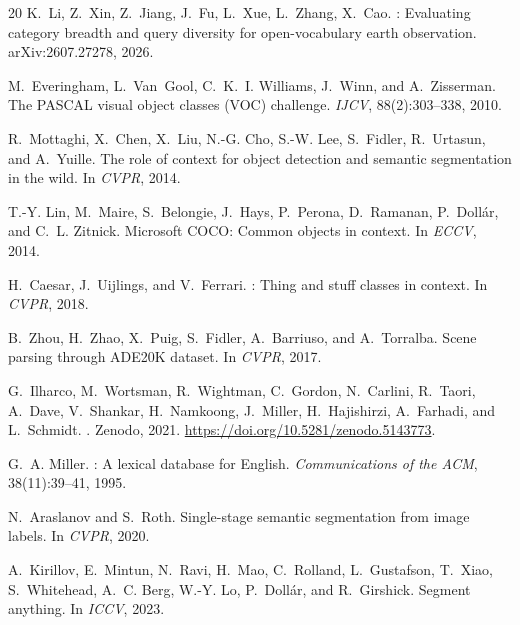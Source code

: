 \documentclass[11pt]{article}
\begin{document}
\begin{thebibliography}{20}
K.~Li, Z.~Xin, Z.~Jiang, J.~Fu, L.~Xue, L.~Zhang, X.~Cao.
: Evaluating category breadth and query diversity for
  open-vocabulary earth observation.
\newblock arXiv:2607.27278, 2026.

M.~Everingham, L.~Van~Gool, C.~K.~I. Williams, J.~Winn, and A.~Zisserman.
\newblock The {PASCAL} visual object classes ({VOC}) challenge.
\newblock \emph{IJCV}, 88(2):303--338, 2010.

R.~Mottaghi, X.~Chen, X.~Liu, N.-G. Cho, S.-W. Lee, S.~Fidler, R.~Urtasun, and
  A.~Yuille.
\newblock The role of context for object detection and semantic segmentation
  in the wild.
\newblock In \emph{CVPR}, 2014.

T.-Y. Lin, M.~Maire, S.~Belongie, J.~Hays, P.~Perona, D.~Ramanan,
  P.~Doll\'ar, and C.~L. Zitnick.
\newblock Microsoft {COCO}: Common objects in context.
\newblock In \emph{ECCV}, 2014.

H.~Caesar, J.~Uijlings, and V.~Ferrari.
: Thing and stuff classes in context.
\newblock In \emph{CVPR}, 2018.

B.~Zhou, H.~Zhao, X.~Puig, S.~Fidler, A.~Barriuso, and A.~Torralba.
\newblock Scene parsing through {ADE20K} dataset.
\newblock In \emph{CVPR}, 2017.

G.~Ilharco, M.~Wortsman, R.~Wightman, C.~Gordon, N.~Carlini, R.~Taori,
  A.~Dave, V.~Shankar, H.~Namkoong, J.~Miller, H.~Hajishirzi, A.~Farhadi, and
  L.~Schmidt.
.
\newblock Zenodo, 2021. \url{https://doi.org/10.5281/zenodo.5143773}.

G.~A. Miller.
: A lexical database for {English}.
\newblock \emph{Communications of the ACM}, 38(11):39--41, 1995.

N.~Araslanov and S.~Roth.
\newblock Single-stage semantic segmentation from image labels.
\newblock In \emph{CVPR}, 2020.

A.~Kirillov, E.~Mintun, N.~Ravi, H.~Mao, C.~Rolland, L.~Gustafson, T.~Xiao,
  S.~Whitehead, A.~C. Berg, W.-Y. Lo, P.~Doll\'ar, and R.~Girshick.
\newblock Segment anything.
\newblock In \emph{ICCV}, 2023.


\end{thebibliography}
\end{document}
